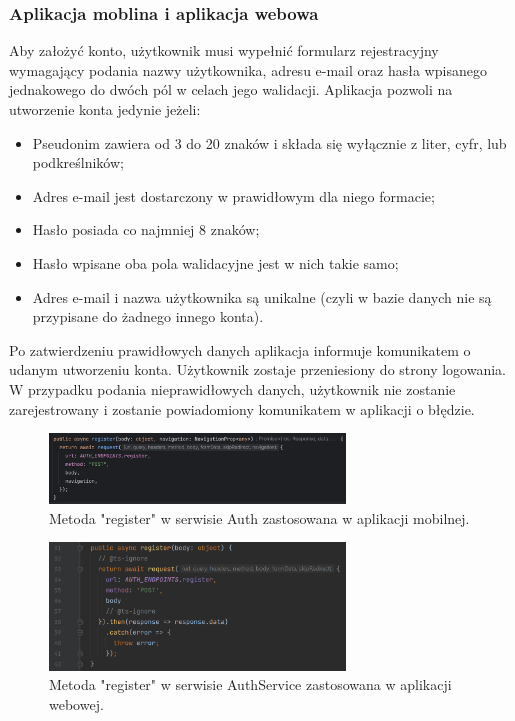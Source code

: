 \subsubsection{Aplikacja moblina i aplikacja webowa}
Aby założyć konto, użytkownik musi wypełnić formularz rejestracyjny wymagający podania nazwy użytkownika, adresu e-mail oraz hasła wpisanego jednakowego do dwóch pól w celach jego walidacji. Aplikacja pozwoli na utworzenie konta jedynie jeżeli:

\begin{itemize}
    \item Pseudonim zawiera od 3 do 20 znaków i składa się wyłącznie z liter, cyfr, lub podkreślników;
    \item Adres e-mail jest dostarczony w prawidłowym dla niego formacie;
    \item Hasło posiada co najmniej 8 znaków;
    \item Hasło wpisane oba pola walidacyjne jest w nich takie samo;
    \item Adres e-mail i nazwa użytkownika są unikalne (czyli w bazie danych nie są przypisane do żadnego innego konta).
\end{itemize}

Po zatwierdzeniu prawidłowych danych aplikacja informuje komunikatem o udanym utworzeniu konta. Użytkownik zostaje przeniesiony do strony logowania. W przypadku podania nieprawidłowych danych, użytkownik nie zostanie zarejestrowany i zostanie powiadomiony komunikatem w aplikacji o błędzie.

\begin{figure}[H]
    \centering
    \includegraphics[width=0.7\textwidth]{chapters/chapter_8/screens/rejestracja_mobile}
    \caption{Metoda "register" w serwisie Auth zastosowana w aplikacji mobilnej.}
    \label{img:rejestracja_mobile}
\end{figure}

\begin{figure}[H]
    \centering
    \includegraphics[width=0.7\textwidth]{chapters/chapter_8/screens/rejestracja_web}
    \caption{Metoda "register" w serwisie AuthService zastosowana w aplikacji webowej.}
    \label{img:rejestracja_web}
\end{figure}

